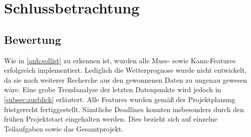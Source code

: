 \section{Schlussbetrachtung}\label{Schlussbetrachtung}

\subsection{Bewertung}\label{subsec:bewertung}
Wie in \autoref{anh:sollist} zu erkennen ist, wurden alle Muss- sowie Kann-Features erfolgreich implementiert.
Lediglich die Wetterprognose wurde nicht entwickelt, da sie nach weiterer Recherche aus den gewonnenen Daten zu ungenau gewesen wäre.
Eine grobe Trendanalyse der letzten Datenpunkte wird jedoch in \autoref{subsec:ausblick} erläutert.
Alle Features wurden gemäß der Projektplanung fristgerecht fertiggestellt.
Sämtliche Deadlines konnten insbesonders durch den frühen Projektstart eingehalten werden.
Dies bezieht sich auf einzelne Teilaufgaben sowie das Gesamtprojekt.

